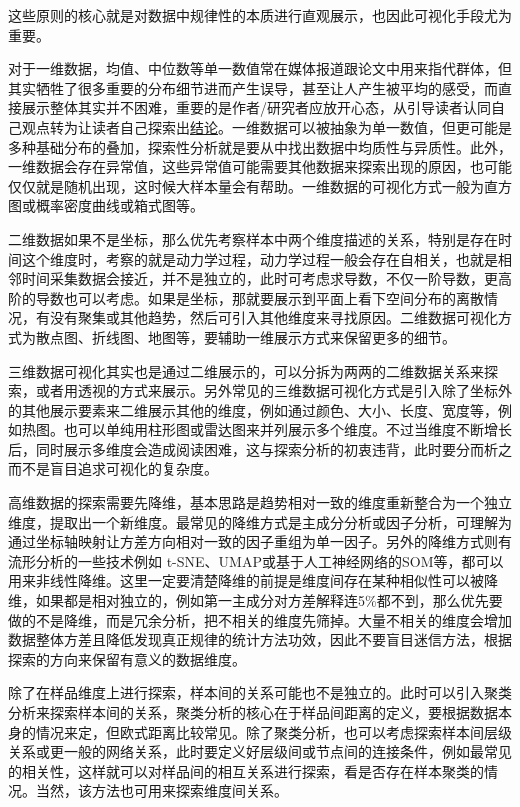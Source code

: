 \documentclass[]{tufte-book}
\begin{document}
这些原则的核心就是对数据中规律性的本质进行直观展示，也因此可视化手段尤为重要。

对于一维数据，均值、中位数等单一数值常在媒体报道跟论文中用来指代群体，但其实牺牲了很多重要的分布细节进而产生误导，甚至让人产生被平均的感受，而直接展示整体其实并不困难，重要的是作者/研究者应放开心态，从引导读者认同自己观点转为让读者自己探索出\href{http://flowingdata.com/2017/07/07/small-summary-stats/}{结论}。一维数据可以被抽象为单一数值，但更可能是多种基础分布的叠加，探索性分析就是要从中找出数据中均质性与异质性。此外，一维数据会存在异常值，这些异常值可能需要其他数据来探索出现的原因，也可能仅仅就是随机出现，这时候大样本量会有帮助。一维数据的可视化方式一般为直方图或概率密度曲线或箱式图等。

二维数据如果不是坐标，那么优先考察样本中两个维度描述的关系，特别是存在时间这个维度时，考察的就是动力学过程，动力学过程一般会存在自相关，也就是相邻时间采集数据会接近，并不是独立的，此时可考虑求导数，不仅一阶导数，更高阶的导数也可以考虑。如果是坐标，那就要展示到平面上看下空间分布的离散情况，有没有聚集或其他趋势，然后可引入其他维度来寻找原因。二维数据可视化方式为散点图、折线图、地图等，要辅助一维展示方式来保留更多的细节。

三维数据可视化其实也是通过二维展示的，可以分拆为两两的二维数据关系来探索，或者用透视的方式来展示。另外常见的三维数据可视化方式是引入除了坐标外的其他展示要素来二维展示其他的维度，例如通过颜色、大小、长度、宽度等，例如热图。也可以单纯用柱形图或雷达图来并列展示多个维度。不过当维度不断增长后，同时展示多维度会造成阅读困难，这与探索分析的初衷违背，此时要分而析之而不是盲目追求可视化的复杂度。

高维数据的探索需要先降维，基本思路是趋势相对一致的维度重新整合为一个独立维度，提取出一个新维度。最常见的降维方式是主成分分析或因子分析，可理解为通过坐标轴映射让方差方向相对一致的因子重组为单一因子。另外的降维方式则有流形分析的一些技术例如 t-SNE、UMAP或基于人工神经网络的SOM等，都可以用来非线性降维。这里一定要清楚降维的前提是维度间存在某种相似性可以被降维，如果都是相对独立的，例如第一主成分对方差解释连5\%都不到，那么优先要做的不是降维，而是冗余分析，把不相关的维度先筛掉。大量不相关的维度会增加数据整体方差且降低发现真正规律的统计方法功效，因此不要盲目迷信方法，根据探索的方向来保留有意义的数据维度。

除了在样品维度上进行探索，样本间的关系可能也不是独立的。此时可以引入聚类分析来探索样本间的关系，聚类分析的核心在于样品间距离的定义，要根据数据本身的情况来定，但欧式距离比较常见。除了聚类分析，也可以考虑探索样本间层级关系或更一般的网络关系，此时要定义好层级间或节点间的连接条件，例如最常见的相关性，这样就可以对样品间的相互关系进行探索，看是否存在样本聚类的情况。当然，该方法也可用来探索维度间关系。
\end{document}
